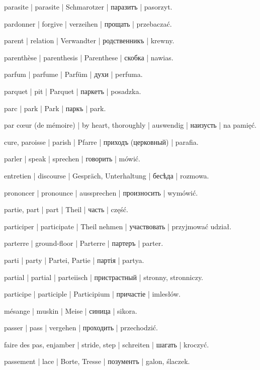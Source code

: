 \begin{outdent}{1em}
parasite | parasite | Schmarotzer | паразитъ | pasorzyt.

pardonner | forgive | verzeihen | прощать | przebaczać.

parent | relation | Verwandter | родственникъ | krewny.

parenthèse | parenthesis | Parenthese | скобка | nawias.

parfum | parfume | Parfüm | духи | perfuma.

parquet | pit | Parquet | паркетъ | posadzka.

parc | park | Park | паркъ | park.

par cœur (de mémoire) | by heart, thoroughly | auswendig | наизусть | na pamięć.

cure, paroisse | parish | Pfarre | приходъ (церковный) | parafia.

parler | speak | sprechen | говорить | mówić.

\uvsubentry{}
entretien | discourse | Gespräch, Unterhaltung | бесѣда | rozmowa.


\uvsubentry{}
prononcer | pronounce | aussprechen | произносить | wymówić.

partie, part | part | Theil | часть | część.

\uvsubentry{}
participer | participate | Theil nehmen | участвовать | przyjmować udział.

parterre | ground-floor | Parterre | партеръ | parter.

parti | party | Partei, Partie | партія | partya.

\uvsubentry{}
partial | partial | parteiisch | пристрастный | stronny, stronniczy.

participe | participle | Participium | причастіе | imlesłów.

mésange | muskin | Meise | синица | sikora.

passer | pass | vergehen | проходить | przechodzić.

faire des pas, enjamber | stride, step | schreiten | шагать | kroczyć.

passement | lace | Borte, Tresse | позументъ | galon, ślaczek.


\end{outdent}
